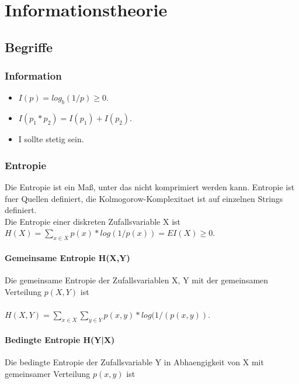 \documentclass[a4paper]{scrreprt}
\begin{document}
\chapter{Informationstheorie}

\section{Begriffe}

\subsection{Information}
\begin{itemize}
	\item $I(p) = log_b(1/p) \ge 0$.
	\item $I(p_1*p_2) = I(p_1) + I(p_2)$.
	\item I sollte stetig sein.
\end{itemize}

\subsection{Entropie}
Die Entropie ist ein Maß, unter das nicht komprimiert werden kann. Entropie ist fuer Quellen definiert, die Kolmogorow-Komplexitaet ist auf einzelnen Strings definiert.\\

Die Entropie einer diskreten Zufallsvariable X ist\\

$H(X) = \sum_{x \in X}p(x)*log(1/p(x)) = EI(X) \ge 0$.

\subsubsection{Gemeinsame Entropie H(X,Y)}
Die gemeinsame Entropie der Zufallsvariablen X, Y mit der gemeinsamen Verteilung $p(X,Y)$ ist\\\\

$H(X,Y) = \sum_{x \in X}\sum_{y \in Y}p(x,y)*log(1/(p(x,y))$.

\subsubsection{Bedingte Entropie H(Y|X)}
Die bedingte Entropie der Zufallsvariable Y in Abhaengigkeit von X mit gemeinsamer Verteilung $p(x,y)$ ist\\\\
\end{document}
